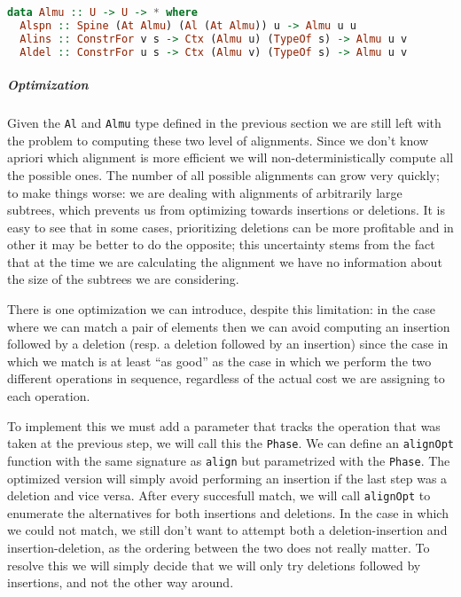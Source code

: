 \documentclass[11pt]{article}
\begin{document}
\begin{lstlisting}[language=haskell]
data Almu :: U -> U -> * where
  Alspn :: Spine (At Almu) (Al (At Almu)) u -> Almu u u
  Alins :: ConstrFor v s -> Ctx (Almu u) (TypeOf s) -> Almu u v
  Aldel :: ConstrFor u s -> Ctx (Almu v) (TypeOf s) -> Almu u v
\end{lstlisting}

\subparagraph{Optimization}\label{optimizations}

Given the \texttt{Al} and \texttt{Almu} type defined in the previous section we are still left with the problem
to computing these two level of alignments. Since we don't know apriori which alignment
is more efficient we will non-deterministically compute all the possible ones. The number of all possible alignments  
can grow very quickly; to make things worse: we are dealing with alignments of arbitrarily large subtrees, which prevents
us from optimizing towards insertions or deletions. It is easy to see
that in some cases, prioritizing deletions can be more profitable and in
other it may be better to do the opposite; this uncertainty stems from
the fact that at the time we are calculating the alignment we have no
information about the size of the subtrees we are considering.

There is one optimization we can introduce, despite this limitation: in
the case where we can match a pair of elements then we can avoid
computing an insertion followed by a deletion (resp. a deletion followed
by an insertion) since the case in which we match is at least ``as
good'' as the case in which we perform the two different operations in
sequence, regardless of the actual cost we are assigning to each
operation.

To implement this we must add a parameter that tracks the operation that
was taken at the previous step, we will call this the \texttt{Phase}. We
can define an \texttt{alignOpt} function with the same signature as
\texttt{align} but parametrized with the \texttt{Phase}. The optimized
version will simply avoid performing an insertion if the last step was a
deletion and vice versa. 
After every succesfull match, we will call \texttt{alignOpt} to enumerate the alternatives for both insertions and
deletions. In the case in which we could not match, we still don't 
want to attempt both a deletion-insertion and insertion-deletion, as the 
ordering between the two does not really matter. To resolve this we will simply 
decide that we will only try deletions followed by insertions, and not the other 
way around.
\end{document}
